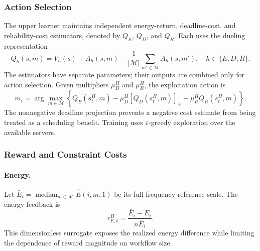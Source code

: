 \documentclass[lettersize,journal]{IEEEtran}
\begin{document}
\subsubsection{Action Selection}

The upper learner maintains independent energy-return, deadline-cost,
and reliability-cost estimators, denoted by $Q_E$, $Q_D$, and $Q_R$.
Each uses the dueling representation~\cite{wang2016dueling}
\begin{equation}
 Q_h(s,m)=V_h(s)+A_h(s,m)
 -\frac{1}{|\mathcal M|}\sum_{m'\in\mathcal M}A_h(s,m'),
 \quad h\in\{E,D,R\}.
 \label{eq:method_dueling}
\end{equation}
The estimators have separate parameters; their outputs are combined
only for action selection. Given multipliers $\mu_D^H$ and $\mu_R^H$,
the exploitation action is
\begin{equation}
 m_i=\arg\max_{m\in\mathcal M}
 \left\{Q_E(s_t^H,m)-\mu_D^H[Q_D(s_t^H,m)]_+
 -\mu_R^H Q_R(s_t^H,m)\right\}.
 \label{eq:method_high_action}
\end{equation}
The nonnegative deadline projection prevents a negative cost estimate
from being treated as a scheduling benefit. Training uses
$\varepsilon$-greedy exploration over the available servers.

\subsubsection{Reward and Constraint Costs}

\paragraph{Energy.}
Let $\bar E_i=\operatorname{median}_{m\in\mathcal M}
\widehat E(i,m,1)$ be its full-frequency reference scale. The energy feedback is
\begin{equation}
 r_{E,t}^H=\frac{\bar E_i-E_i}{n\bar E_i}.
 \label{eq:method_high_energy}
\end{equation}
This dimensionless surrogate exposes the realized energy difference
while limiting the dependence of reward magnitude on workflow size.
\end{document}
